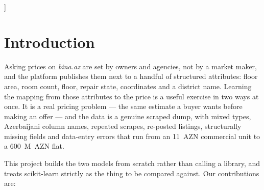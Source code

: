 \documentclass[10pt,twocolumn,a4paper]{article}
\begin{document}
]

\section{Introduction}
Asking prices on \emph{bina.az} are set by owners and agencies, not by a
market maker, and the platform publishes them next to a handful of structured
attributes: floor area, room count, floor, repair state, coordinates and a
district name. Learning the mapping from those attributes to the price is a
useful exercise in two ways at once. It is a real pricing problem --- the same
estimate a buyer wants before making an offer --- and the data is a genuine
scraped dump, with mixed types, Azerbaijani column names, repeated scrapes,
re-posted listings, structurally missing fields and data-entry errors that
run from an 11~AZN commercial unit to a 600~M~AZN flat.

This project builds the two models from scratch rather than calling a library,
and treats scikit-learn strictly as the thing to be compared against. Our
contributions are:
\end{document}
